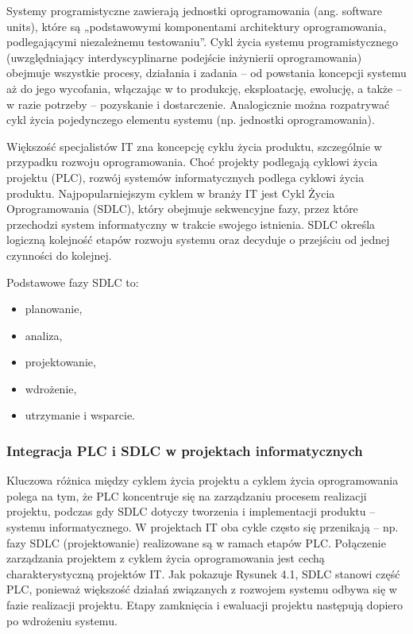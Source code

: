 Systemy programistyczne zawierają jednostki oprogramowania (ang. software units), które są „podstawowymi komponentami architektury oprogramowania, podlegającymi niezależnemu testowaniu”. Cykl życia systemu programistycznego (uwzględniający interdyscyplinarne podejście inżynierii oprogramowania) obejmuje wszystkie procesy, działania i zadania – od powstania koncepcji systemu aż do jego wycofania, włączając w to produkcję, eksploatację, ewolucję, a także – w razie potrzeby – pozyskanie i dostarczenie. Analogicznie można rozpatrywać cykl życia pojedynczego elementu systemu (np. jednostki oprogramowania). \autocite{swebok}

Większość specjalistów IT zna koncepcję cyklu życia produktu, szczególnie w przypadku rozwoju oprogramowania. \autocite{ITPM} Choć projekty podlegają cyklowi życia projektu (PLC), rozwój systemów informatycznych podlega cyklowi życia produktu. Najpopularniejszym cyklem w branży IT jest Cykl Życia Oprogramowania (SDLC), który obejmuje sekwencyjne fazy, przez które przechodzi system informatyczny w trakcie swojego istnienia. \autocite{ITPMMarchewka} SDLC określa logiczną kolejność etapów rozwoju systemu oraz decyduje o przejściu od jednej czynności do kolejnej. \autocite{McConnell}

Podstawowe fazy SDLC to:
\begin{itemize}
    \item planowanie,
    \item analiza,
    \item projektowanie,
    \item wdrożenie,
    \item utrzymanie i wsparcie. \autocite{ITPMMarchewka}
\end{itemize}

\subsubsection{Integracja PLC i SDLC w projektach informatycznych}
Kluczowa różnica między cyklem życia projektu a cyklem życia oprogramowania polega na tym, że PLC koncentruje się na zarządzaniu procesem realizacji projektu, podczas gdy SDLC dotyczy tworzenia i implementacji produktu – systemu informatycznego. W projektach IT oba cykle często się przenikają – np. fazy SDLC (projektowanie) realizowane są w ramach etapów PLC. Połączenie zarządzania projektem z cyklem życia oprogramowania jest cechą charakterystyczną projektów IT. Jak pokazuje Rysunek 4.1, SDLC stanowi część PLC, ponieważ większość działań związanych z rozwojem systemu odbywa się w fazie realizacji projektu. Etapy zamknięcia i ewaluacji projektu następują dopiero po wdrożeniu systemu. \autocite{ITPMMarchewka}


